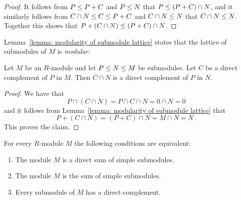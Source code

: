 \begin{proof}
  It follows from $P \leq P + C$ and $P \leq N$ that $P \leq (P + C) \cap N$, and it similarly follows from $C \cap N \leq C \leq P + C$ and $C \cap N \leq N$ that $C \cap N \leq N$.
  Together this shows that $P + (C \cap N) \leq (P + C) \cap N$.
\end{proof}


\begin{remark}
  Lemma~\ref{lemma: modularity of submodule lattice} states that the lattice of submodules of $M$ is \emph{modular}.
\end{remark}


\begin{corollary}
  \label{corollary: direct complements in submodules}
  Let $M$ be an $R$-module and let $P \leq N \leq M$ be submodules.
  Let $C$ be a direct complement of $P$ in $M$.
  Then $C \cap N$ is a direct complement of $P$ in $N$.
\end{corollary}


\begin{proof}
  We have that
  \[
      P \cap (C \cap N)
    = P \cap C \cap N
    = 0 \cap N
    = 0
  \]
  and it follows from Lemma~\ref{lemma: modularity of submodule lattice} that
  \[
      P + (C \cap N)
    = (P + C) \cap N
    = M \cap N
    = N \,.
  \]
  This proves the claim.
\end{proof}




\begin{proposition}
  \label{proposition: characterisation semisimple modules}
  For every $R$-module $M$ the following conditions are equivalent:
  \begin{enumerate}
    \item
      \label{enumerate: direct sum of simple}
      The module $M$ is a direct sum of simple submodules. 
    \item
      \label{enumerate: sum of simple}
      The module $M$ is the sum of simple submodules.
    \item
      \label{enumerate: direct complements}
      Every submodule of $M$ has a direct complement.
  \end{enumerate}
\end{proposition}


